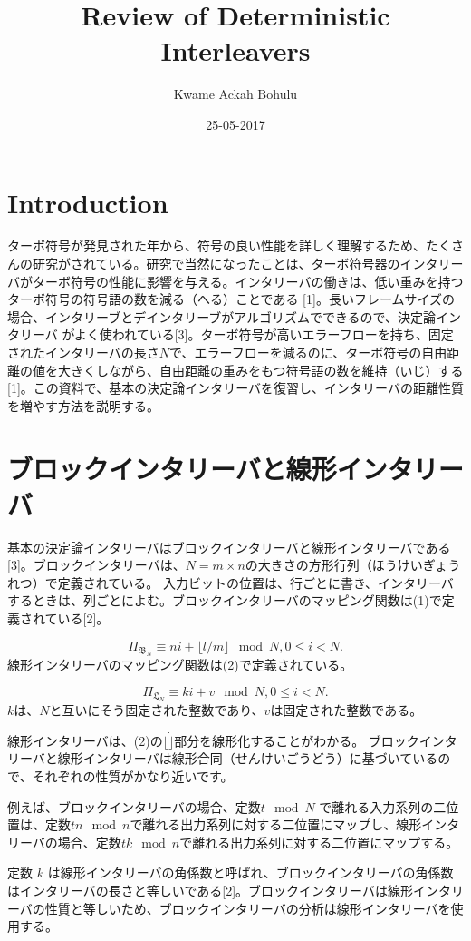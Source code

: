 \documentclass[20 pts]{article}
\title{Review of Deterministic Interleavers}
\author{Kwame Ackah Bohulu}
\date{25-05-2017}
\begin{document}
\maketitle


\section{Introduction}
 ターボ符号が発見された年から、符号の良い性能を詳しく理解するため、たくさんの研究がされている。研究で当然になったことは、ターボ符号器のインタリーバがターボ符号の性能に影響を与える。インタリーバの働きは、低い重みを持つターボ符号の符号語の数を減る（へる）ことである
[1]。長いフレームサイズの場合、インタリーブとデインタリーブがアルゴリズムでできるので、決定論インタリーバ がよく使われている[3]。ターボ符号が高いエラーフローを持ち、固定されたインタリーバの長さ$N$で、エラーフローを減るのに、ターボ符号の自由距離の値を大きくしながら、自由距離の重みをもつ符号語の数を維持（いじ）する[1]。この資料で、基本の決定論インタリーバを復習し、インタリーバの距離性質を増やす方法を説明する。

\section{ブロックインタリーバと線形インタリーバ}
基本の決定論インタリーバはブロックインタリーバと線形インタリーバである[3]。ブロックインタリーバは、$N=m\times n$の大きさの方形行列（ほうけいぎょうれつ）で定義されている。  入力ビットの位置は、行ごとに書き、インタリーバするときは、列ごとによむ。ブロックインタリーバのマッピング関数は(1)で定義されている[2]。

$$\Pi_{\mathfrak{B}_N} \equiv ni + \lfloor l/m\rfloor \mod {N},		0\leq i < N.$$
線形インタリーバのマッピング関数は(2)で定義されている。

$$\Pi_{\mathfrak{L}_N} \equiv ki + v \mod {N},		0\leq i < N.$$
$k$は、$N$と互いにそう固定された整数であり、$v$は固定された整数である。

 線形インタリーバは、(2)の$\lfloor \dot \rfloor$部分を線形化することがわかる。
ブロックインタリーバと線形インタリーバは線形合同（せんけいごうどう）に基づいているので、それぞれの性質がかなり近いです。

例えば、ブロックインタリーバの場合、定数$t\mod {N}$ で離れる入力系列の二位置は、定数$tn\mod{n}$で離れる出力系列に対する二位置にマップし、線形インタリーバの場合、定数$tk
\mod{n}$で離れる出力系列に対する二位置にマップする。

定数 $k$ は線形インタリーバの角係数と呼ばれ、ブロックインタリーバの角係数はインタリーバの長さと等しいである[2]。ブロックインタリーバは線形インタリーバの性質と等しいため、ブロックインタリーバの分析は線形インタリーバを使用する。
\end{document}
